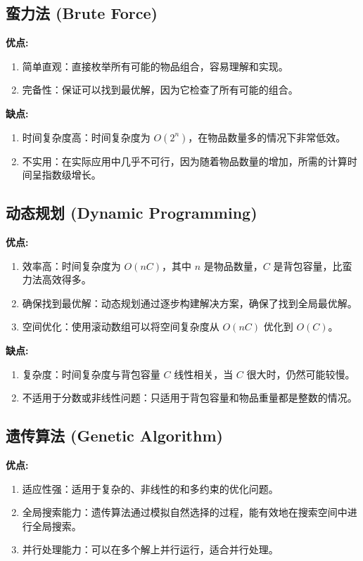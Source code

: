 \documentclass[UTF8,titlepage]{ctexart}
\numberwithin{figure}{section}
\begin{document}
\subsection*{蛮力法 (Brute Force)}

\textbf{优点:}
\begin{enumerate}
    \item 简单直观：直接枚举所有可能的物品组合，容易理解和实现。
    \item 完备性：保证可以找到最优解，因为它检查了所有可能的组合。
\end{enumerate}

\textbf{缺点:}
\begin{enumerate}
    \item 时间复杂度高：时间复杂度为 $O(2^n)$，在物品数量多的情况下非常低效。
    \item 不实用：在实际应用中几乎不可行，因为随着物品数量的增加，所需的计算时间呈指数级增长。
\end{enumerate}

\subsection*{动态规划 (Dynamic Programming)}

\textbf{优点:}
\begin{enumerate}
    \item 效率高：时间复杂度为 $O(nC)$，其中 $n$ 是物品数量，$C$ 是背包容量，比蛮力法高效得多。
    \item 确保找到最优解：动态规划通过逐步构建解决方案，确保了找到全局最优解。
    \item 空间优化：使用滚动数组可以将空间复杂度从 $O(nC)$ 优化到 $O(C)$。
\end{enumerate}

\textbf{缺点:}
\begin{enumerate}
    \item 复杂度：时间复杂度与背包容量 $C$ 线性相关，当 $C$ 很大时，仍然可能较慢。
    \item 不适用于分数或非线性问题：只适用于背包容量和物品重量都是整数的情况。
\end{enumerate}

\subsection*{遗传算法 (Genetic Algorithm)}

\textbf{优点:}
\begin{enumerate}
    \item 适应性强：适用于复杂的、非线性的和多约束的优化问题。
    \item 全局搜索能力：遗传算法通过模拟自然选择的过程，能有效地在搜索空间中进行全局搜索。
    \item 并行处理能力：可以在多个解上并行运行，适合并行处理。
\end{enumerate}
\end{document}
